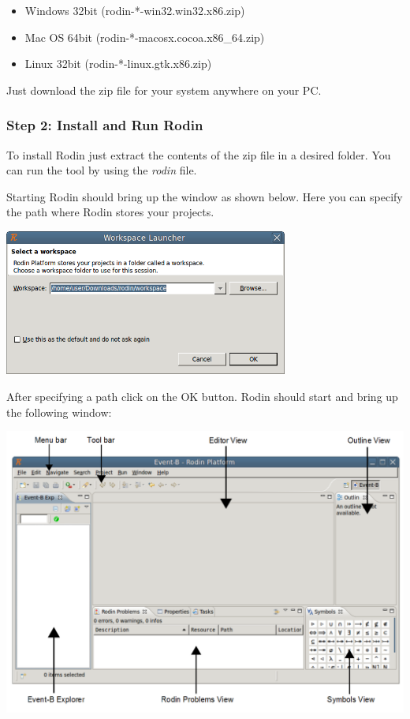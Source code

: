 \begin{itemize}
	\item Windows 32bit (rodin-*-win32.win32.x86.zip)
	\item Mac OS 64bit (rodin-*-macosx.cocoa.x86\_64.zip)
	\item Linux 32bit (rodin-*-linux.gtk.x86.zip)
\end{itemize}

Just download the zip file for your system anywhere on your PC.


\subsubsection{Step 2: Install and Run Rodin}

To install Rodin just extract the contents of the zip file in a desired folder. You can run the tool by using the \textit{rodin} file.

Starting Rodin should bring up the window as shown below. Here you can specify the path where Rodin stores your projects.

\begin{center}
	\includegraphics[width=0.7\textwidth]{img/tutorial/install2.png}
\end{center}

After specifying a path click on the \textsf{OK} button. Rodin should start and bring up the following window:

\begin{center}
	\includegraphics[width=1.0\textwidth]{img/tutorial/install3.png}
\end{center}

